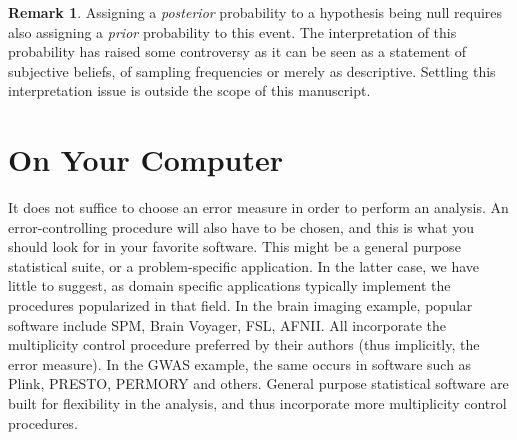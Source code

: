 \documentclass[review,12pt]{article}
\theoremstyle{definition}
\theoremstyle{definition}
\newtheorem{remark}{Remark}[section]
\begin{document}
\begin{remark}\label{sec:baeysian_interpretation}
Assigning a \emph{posterior} probability to a hypothesis being null requires also assigning a \emph{prior} probability to this event. The interpretation of this probability has raised some controversy \cite[e.g.][]{morris_comment:_2008} as it can be seen as a statement of subjective beliefs, of sampling frequencies or merely as descriptive. Settling this interpretation issue is outside the scope of this manuscript.
\end{remark}














\appendix

\section{\label{sec:on_your_pc} On Your Computer}
It does not suffice to choose an error measure in order to perform an analysis. An error-controlling procedure will also have to be chosen, and this is what you should look for in your favorite software. This might be a general purpose statistical suite, or a problem-specific application. In the latter case, we have little to suggest, as domain specific applications typically implement the procedures popularized in that field. 
In the brain imaging example, popular software include SPM, Brain Voyager, FSL, AFNII. All incorporate the multiplicity control procedure preferred by their authors (thus implicitly, the error measure). 
In the GWAS example, the same occurs in software such as Plink, PRESTO, PERMORY and others. 
General purpose statistical software are built for flexibility in the analysis, and thus incorporate more multiplicity control procedures. 
\end{document}
